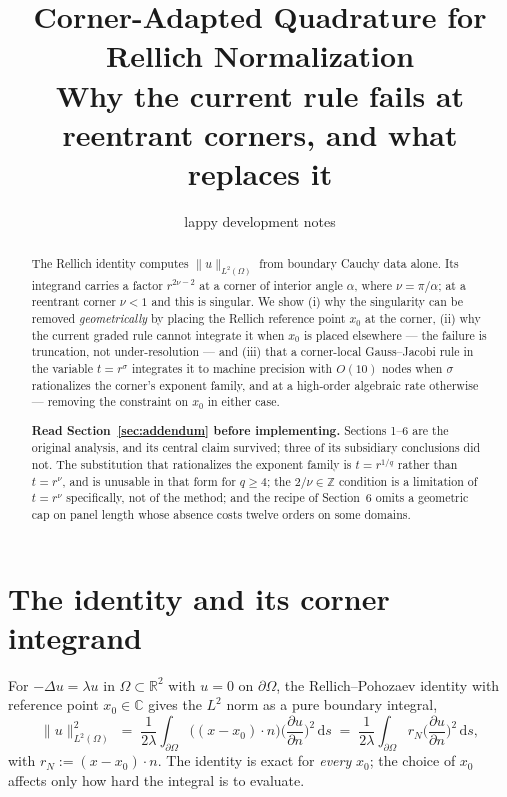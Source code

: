 \documentclass[11pt]{article}
\title{Corner-Adapted Quadrature for Rellich Normalization\\
\large Why the current rule fails at reentrant corners, and what replaces it}
\author{lappy development notes}
\date{}
\theoremstyle{remark}
\newcommand{\dd}{\,\mathrm{d}}
\newcommand{\Om}{\Omega}
\newcommand{\pd}[2]{\frac{\partial #1}{\partial #2}}
\newcommand{\R}{\mathbb{R}}
\begin{document}
\maketitle

\begin{abstract}
The Rellich identity computes $\|u\|_{L^2(\Om)}$ from boundary Cauchy data alone.
Its integrand carries a factor $r^{2\nu-2}$ at a corner of interior angle
$\alpha$, where $\nu=\pi/\alpha$; at a reentrant corner $\nu<1$ and this is
singular. We show (i) why the singularity can be removed \emph{geometrically} by
placing the Rellich reference point $x_0$ at the corner, (ii) why the current
graded rule cannot integrate it when $x_0$ is placed elsewhere --- the failure is
truncation, not under-resolution --- and (iii) that a corner-local Gauss--Jacobi
rule in the variable $t=r^{\sigma}$ integrates it to machine precision with $O(10)$
nodes when $\sigma$ rationalizes the corner's exponent family, and at a high-order
algebraic rate otherwise --- removing the constraint on $x_0$ in either case.

\medskip\noindent
\textbf{Read Section~\ref{sec:addendum} before implementing.} Sections 1--6 are
the original analysis, and its central claim survived; three of its subsidiary
conclusions did not. The substitution that rationalizes the exponent family is
$t=r^{1/q}$ rather than $t=r^{\nu}$, and is unusable in that form for $q\ge4$; the
$2/\nu\in\mathbb{Z}$ condition is a limitation of $t=r^{\nu}$ specifically, not of
the method; and the recipe of Section~6 omits a geometric cap on panel length whose
absence costs twelve orders on some domains.
\end{abstract}

\section{The identity and its corner integrand}

For $-\Delta u=\lambda u$ in $\Om\subset\R^2$ with $u=0$ on $\partial\Om$, the
Rellich--Pohozaev identity with reference point $x_0\in\mathbb{C}$ gives the
$L^2$ norm as a pure boundary integral,
\begin{equation}\label{eq:rellich}
  \|u\|_{L^2(\Om)}^2
  \;=\; \frac{1}{2\lambda}\int_{\partial\Om}
        \big((x-x_0)\cdot n\big)\Big(\pd{u}{n}\Big)^{\!2}\dd s
  \;=\;\frac{1}{2\lambda}\int_{\partial\Om} r_N \Big(\pd{u}{n}\Big)^{\!2}\dd s ,
\end{equation}
with $r_N:=(x-x_0)\cdot n$. The identity is exact for \emph{every} $x_0$; the
choice of $x_0$ affects only how hard the integral is to evaluate.
\end{document}

